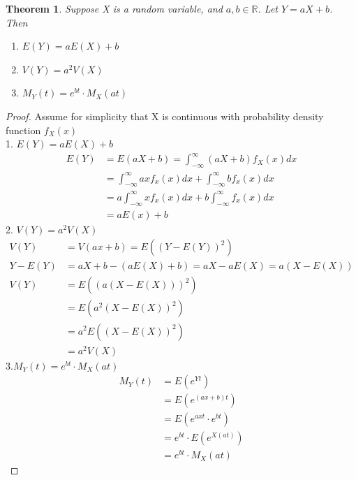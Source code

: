 \documentclass[11pt,oneside]{book}
\theoremstyle{break}
\theoremstyle{break}
\newtheorem{thm}{Theorem}[section]
\begin{document}
\begin{thm}
Suppose X is a random variable, and $a,b\in \mathbb{R}$. Let $Y=aX+b$. Then \begin{enumerate}
\item $E(Y)=aE(X)+b$
\item $V(Y)=a^2V(X)$
\item $M_Y(t)=e^{bt}\cdot M_X(at)$
\end{enumerate}
\end{thm}
\begin{proof}
Assume for simplicity that X is continuous with probability density function $f_X(x)$\\
1. $E(Y)=aE(X)+b$ \begin{align*}
E(Y)&=E(aX+b)=\int_{-\infty}^{\infty}(aX+b)f_X(x)dx\\
&=\int_{-\infty}^{\infty}axf_x(x)dx+\int_{-\infty}^{\infty}bf_x(x)dx\\
&=a\int_{-\infty}^{\infty}xf_x(x)dx+b\int_{-\infty}^{\infty}f_x(x)dx\\
&=aE(x)+b
\end{align*}
2.  $V(Y)=a^2V(X)$ \begin{align*}
V(Y)&=V(ax+b)=E((Y-E(Y))^2)\\
Y-E(Y)&=aX+b-(aE(X)+b)=aX-aE(X)=a(X-E(X))\\
V(Y)&=E((a(X-E(X)))^2)\\
&=E(a^2(X-E(X))^2)\\
&=a^2E((X-E(X))^2)\\
&=a^2V(X)
\end{align*}
3.$M_Y(t)=e^{bt}\cdot M_X(at)$\begin{align*}
M_Y(t)&=E(e^{Yt})\\
&=E(e^{(ax+b)t})\\
&=E(e^{axt}\cdot e^{bt})\\
&=e^{bt}\cdot E(e^{X(at)})\\
&=e^{bt}\cdot M_X(at)
\end{align*}
\end{proof}
\end{document}
